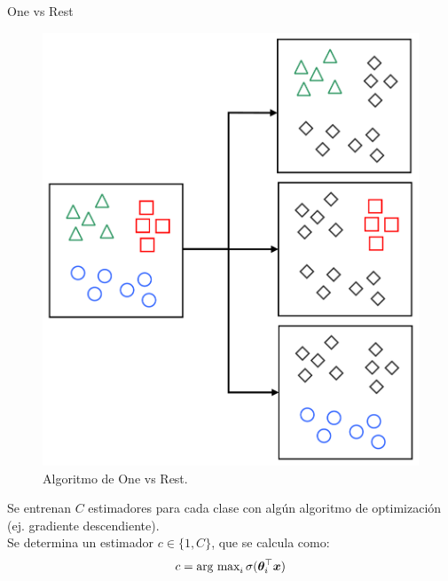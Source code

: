 \documentclass[10pt]{beamer}
\begin{document}
\begin{frame}{One vs Rest}
  \noindent\begin{minipage}{0.5\textwidth}
    \begin{figure}[H]
      \centering
      \includegraphics[width=\textwidth]{Images/one-vs-rest.pdf}
      \caption[Algoritmo de One vs Rest]{Algoritmo de One vs Rest.}
      \label{fig:ovr-algo}
    \end{figure}
  \end{minipage}%
  \hfill%
  \begin{minipage}{0.4\textwidth}
    Se entrenan $C$ estimadores para cada clase con algún algoritmo de optimización (ej. gradiente descendiente). \\
    
    Se determina un estimador $c \in \{1, C\}$, que se calcula como:
    \begin{equation*}
      c = \text{arg max}_i \, \sigma({\bm{\theta}}_i^{\top} {\bm{x}})
    \end{equation*}
  \end{minipage}
\end{frame}
\end{document}
